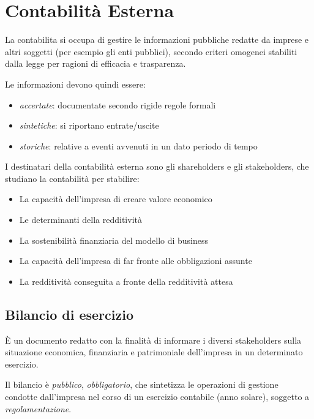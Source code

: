 \chapter{Contabilità Esterna}
La \gls{contabilita} si occupa di gestire le informazioni pubbliche redatte da 
imprese e altri soggetti (per esempio gli enti pubblici), secondo criteri omogenei 
stabiliti dalla legge per ragioni di efficacia e trasparenza.

Le informazioni devono quindi essere:
\begin{itemize}
    \item \emph{accertate}: documentate secondo rigide regole formali
    \item \emph{sintetiche}: si riportano entrate/uscite
    \item \emph{storiche}: relative a eventi avvenuti in un dato periodo di tempo
\end{itemize}

I destinatari della contabilità esterna sono gli \glspl{shareholder} e gli
\glspl{stakeholder}, che studiano la contabilità per stabilire:
\begin{itemize}
    \item La capacità dell’impresa di creare valore economico
    \item Le determinanti della redditività
    \item La sostenibilità finanziaria del modello di business
    \item La capacità dell’impresa di far fronte alle obbligazioni assunte
    \item La redditività conseguita a fronte della redditività attesa
\end{itemize}
 
\section{Bilancio di esercizio}
È un documento redatto con la finalità di informare i diversi \glspl{stakeholder}
sulla situazione economica, finanziaria e patrimoniale dell’impresa in un determinato
\gls{esercizio}.

Il bilancio è \emph{pubblico}, \emph{obbligatorio}, che sintetizza le operazioni
di gestione condotte dall’impresa nel corso di un esercizio contabile (anno solare),
soggetto a \emph{regolamentazione}.

